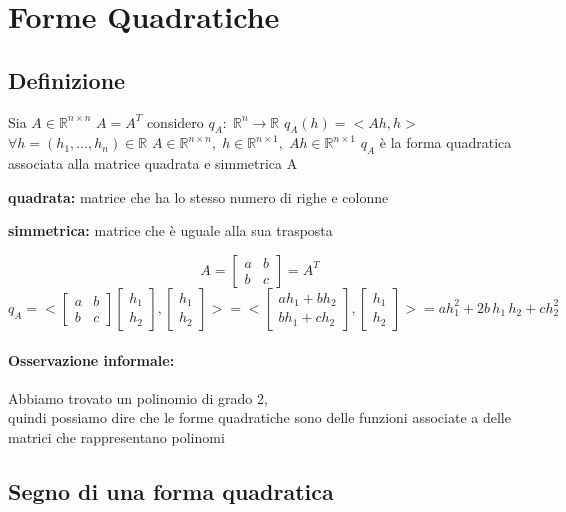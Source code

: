 \documentclass[12pt]{article}
\newcommand {\R}{\mathbb{R}}
\begin{document}
\section{Forme Quadratiche}

\subsection{Definizione}

Sia $A\in \R ^ {n\times n}$ $A=A^T$ considero $q_A:\; \R^n \rightarrow \R $ $q_A(h) = <Ah, h>$\newline
$\forall h = (h_1,\dots, h_n)\in \R$ \qquad $A\in \R^{n\times n},\;h\in \R^{n\times 1},\; Ah\in \R^{n\times 1}$\newline
$q_A$ è la forma quadratica associata alla matrice quadrata e simmetrica A

\textbf{quadrata:} matrice che ha lo stesso numero di righe e colonne

\textbf{simmetrica:} matrice che è uguale alla sua trasposta


$$
    A =
    \begin{bmatrix}
        a & b \\
        b & c
    \end{bmatrix}
    = A^T
$$
$$
    q_A = <
    \begin{bmatrix}
        a & b \\
        b & c
    \end{bmatrix}
    \begin{bmatrix}
        h_1 \\
        h_2
    \end{bmatrix},
    \begin{bmatrix}
        h_1 \\
        h_2
    \end{bmatrix}
    > = <
    \begin{bmatrix}
        ah_1 + bh_2 \\
        bh_1 + ch_2
    \end{bmatrix},
    \begin{bmatrix}
        h_1 \\
        h_2
    \end{bmatrix}
    > = ah_1^2+2b\,h_1\,h_2+ch_2^2
$$

\paragraph{Osservazione informale:}
Abbiamo trovato un polinomio di grado 2,\\
quindi possiamo dire che le forme quadratiche sono delle funzioni
associate a delle matrici che rappresentano polinomi


\subsection{Segno di una forma quadratica}
\end{document}
